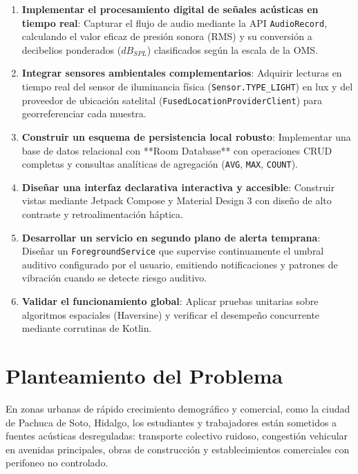 \documentclass[12pt,a4paper]{article}
\begin{document}
\begin{enumerate}[label=\textbf{\arabic*.}]
    \item \textbf{Implementar el procesamiento digital de señales acústicas en tiempo real}: Capturar el flujo de audio mediante la API \texttt{AudioRecord}, calculando el valor eficaz de presión sonora (RMS) y su conversión a decibelios ponderados ($dB_{SPL}$) clasificados según la escala de la OMS.
    \item \textbf{Integrar sensores ambientales complementarios}: Adquirir lecturas en tiempo real del sensor de iluminancia física (\texttt{Sensor.TYPE\_LIGHT}) en lux y del proveedor de ubicación satelital (\texttt{FusedLocationProviderClient}) para georreferenciar cada muestra.
    \item \textbf{Construir un esquema de persistencia local robusto}: Implementar una base de datos relacional con **Room Database** con operaciones CRUD completas y consultas analíticas de agregación (\texttt{AVG}, \texttt{MAX}, \texttt{COUNT}).
    \item \textbf{Diseñar una interfaz declarativa interactiva y accesible}: Construir vistas mediante Jetpack Compose y Material Design 3 con diseño de alto contraste y retroalimentación háptica.
    \item \textbf{Desarrollar un servicio en segundo plano de alerta temprana}: Diseñar un \texttt{ForegroundService} que supervise continuamente el umbral auditivo configurado por el usuario, emitiendo notificaciones y patrones de vibración cuando se detecte riesgo auditivo.
    \item \textbf{Validar el funcionamiento global}: Aplicar pruebas unitarias sobre algoritmos espaciales (Haversine) y verificar el desempeño concurrente mediante corrutinas de Kotlin.
\end{enumerate}

\section{Planteamiento del Problema}

En zonas urbanas de rápido crecimiento demográfico y comercial, como la ciudad de Pachuca de Soto, Hidalgo, los estudiantes y trabajadores están sometidos a fuentes acústicas desreguladas: transporte colectivo ruidoso, congestión vehicular en avenidas principales, obras de construcción y establecimientos comerciales con perifoneo no controlado.
\end{document}

